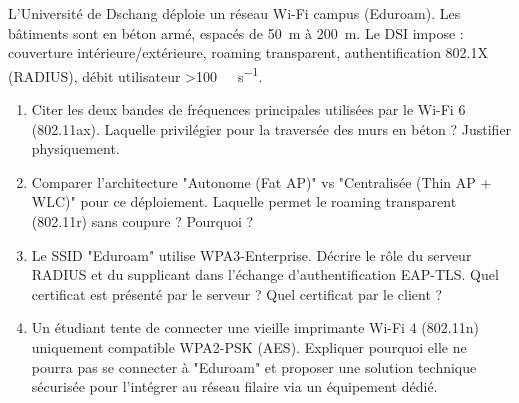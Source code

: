\documentclass[11pt]{article}
\begin{document}
\begin{exercice}
L'Université de Dschang déploie un réseau Wi-Fi campus (Eduroam). Les bâtiments sont en béton armé, espacés de \SI{50}{\metre} à \SI{200}{\metre}. Le DSI impose : couverture intérieure/extérieure, roaming transparent, authentification 802.1X (RADIUS), débit utilisateur \textgreater \SI{100}{\mega\bit\per\second}.
\begin{enumerate}
    \item Citer les deux bandes de fréquences principales utilisées par le Wi-Fi 6 (802.11ax). Laquelle privilégier pour la traversée des murs en béton ? Justifier physiquement.
    \item Comparer l'architecture "Autonome (Fat AP)" vs "Centralisée (Thin AP + WLC)" pour ce déploiement. Laquelle permet le roaming transparent (802.11r) sans coupure ? Pourquoi ?
    \item Le SSID "Eduroam" utilise WPA3-Enterprise. Décrire le rôle du serveur RADIUS et du supplicant dans l'échange d'authentification EAP-TLS. Quel certificat est présenté par le serveur ? Quel certificat par le client ?
    \item Un étudiant tente de connecter une vieille imprimante Wi-Fi 4 (802.11n) uniquement compatible WPA2-PSK (AES). Expliquer pourquoi elle ne pourra pas se connecter à "Eduroam" et proposer une solution technique sécurisée pour l'intégrer au réseau filaire via un équipement dédié.
\end{enumerate}
\end{exercice}
\end{document}
